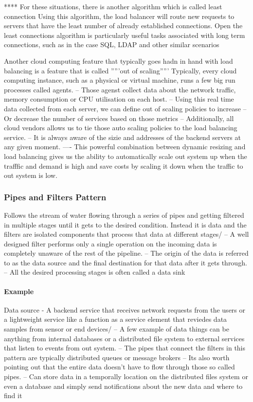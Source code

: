 \documentclass[a4paper, 11pt]{book}
\begin{document}
{    **** For these situations, there is another algorithm which is called least connection
    Using this algorithm, the load balancer will route new requests to servers that have the least number of already established connections.
    Open the least connections algorithm is particularly useful tasks associated with long term connections, such as in the case SQL, LDAP and other similar scenarios

    Another cloud computing feature that typically goes hadn in hand with load balancing is a feature that is called '''''out of scaling'''''
    Typically, every cloud computing instance, such as a physical or virtual machine, runs a few big run processes called agents.
    -- Those agenst collect data about the network traffic, memory consumption or CPU utilisation on each host.
    -- Using this real time data collected from each server, we can define out of scaling policies to increase
    -- Or decrease the number of services based on those metrics
    -- Additionally, all cloud vendors allows us to tie those auto scaling policies to the load balancing service.
    -- It is always aware of the sizie and addresses of the backend servers at any given moment.
    ---- This powerful combination between dynamic resizing and load balancing gives us the ability to automatically scale out system up when the trafffic and demand is high and save costs by scaling it down when the traffic to out system is low.

    \subsubsection{Pipes and Filters Pattern}
    Follows the stream of water flowing through a series of pipes and getting filtered in multiple stages until it gets to the desired condition.
    Instead it is data and the filters are isolated components that process that data at different stages/
    -- A well designed filter performs only a single operation on the incoming data is completely unaware of the rest of the pipeline.
    -- The origin of the data is referred to as the data source and the final destination for that data after it gets through.
    -- All the desired processing stages is often called a data sink

    \paragraph{Example}
    Data source - A backend service that receives network requests from the users or a lightweight service like a function as a service element that reviedes data samples from sensor or end devices/
    -- A few example of data things can be anything from internal databases or a distributed file system to external services that listen to events from out system.
    -- The pipes that connect the filters in this pattern are typically distributed queues or message brokers
    -- Its also worth pointing out that the entire data doesn't have to flow through those so called pipes.
    -- Can store data in a temporally location on the distributed files system or even a database and simply send notifications about the new data and where to find it

}
\end{document}
